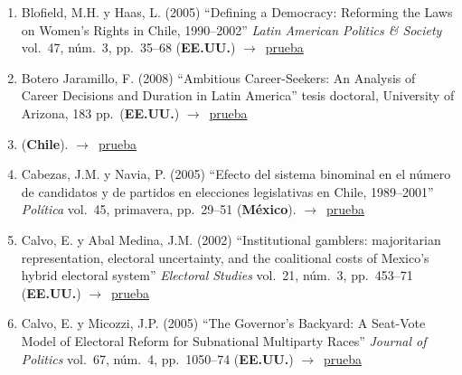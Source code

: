 \documentclass[12 pt, letter]{article}
\newenvironment{CitasMiTrabajo}{
    \begin{footnotesize}
    \begin{enumerate}[label={\footnotesize\emph{cita~\arabic*}},ref=\arabic*] %
        \setlength{\itemsep}{.1\itemsep}
        \setlength{\parskip}{.1\parskip}
    }{\end{enumerate}\end{footnotesize}}
\begin{document}
\begin{CitasMiTrabajo}

        \item Blofield, M.H. y Haas, L. (2005)
        ``Defining a Democracy: Reforming the Laws on Women's Rights in Chile, 1990--2002'' \emph{Latin American
        Politics \& Society} vol.\ 47, n\'um.\ 3, pp.\ 35--68  (\textbf{EE.UU.}) $\rightarrow$~\href{https://github.com/emagar/cv/blob/master/citasMiTrab/mrs/blofieldHaas.pdf}{prueba}

        \item Botero Jaramillo, F. (2008)
        ``Ambitious Career-Seekers: An Analysis of Career Decisions and Duration in Latin America'' tesis doctoral, University of Arizona, 183 pp.\ (\textbf{EE.UU.}) $\rightarrow$~\href{https://github.com/emagar/cv/blob/master/citasMiTrab/mrs/Botero2008.pdf}{prueba}

        \item {} (\textbf{Chile}). $\rightarrow$~\href{https://www.redalyc.org/pdf/324/32442271001.pdf}{prueba}          
          
        \item Cabezas, J.M. y Navia, P. (2005)
        ``Efecto del sistema binominal en el n\'umero de candidatos y de partidos en elecciones legislativas en Chile, 1989--2001''
        \emph{Pol\'itica} vol.\ 45, primavera, pp.\ 29--51  (\textbf{M\'exico}). $\rightarrow$~\href{https://github.com/emagar/cv/blob/master/citasMiTrab/mrs/cabezas.naviaNcandBinomial2005.pdf}{prueba}

        \item Calvo, E. y Abal Medina, J.M. (2002)
        ``Institutional
        gamblers: majoritarian representation, electoral uncertainty, and the
        coalitional costs of Mexico's hybrid electoral system''
        \emph{Electoral Studies} vol.\ 21, n\'um.\ 3, pp.\ 453--71 (\textbf{EE.UU.}) $\rightarrow$~\href{https://github.com/emagar/cv/blob/master/citasMiTrab/mrs/calvoMedina.pdf}{prueba}

        \item Calvo, E. y Micozzi, J.P. (2005)
        ``The Governor's Backyard: A
        Seat-Vote Model of Electoral Reform for Subnational Multiparty Races''
        \emph{Journal of Politics} vol.\ 67, n\'um.\ 4, pp.\ 1050--74 (\textbf{EE.UU.}) $\rightarrow$~\href{https://github.com/emagar/cv/blob/master/citasMiTrab/mrs/calvoMicozzi.pdf}{prueba}


\end{CitasMiTrabajo}
\end{document}

